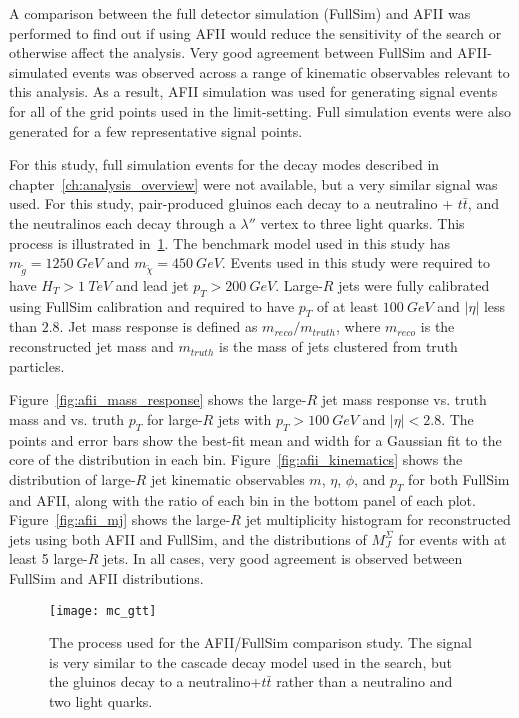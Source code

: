 A comparison between the full detector simulation (FullSim) and AFII was performed to find out if using AFII would reduce the sensitivity of the search or otherwise affect the analysis.
Very good agreement between FullSim and AFII-simulated events was observed across a range of kinematic observables relevant to this analysis.
As a result, AFII simulation was used for generating signal events for all of the grid points used in the limit-setting.
Full simulation events were also generated for a few representative signal points.

For this study, full simulation events for the decay modes described in chapter~\ref{ch:analysis_overview} were not available, but a very similar signal was used.
For this study, pair-produced gluinos each decay to a neutralino + $t\bar{t}$, and the neutralinos each decay through a $\lambda''$ vertex to three light quarks.
This process is illustrated in~\ref{fig:mc_gtt}.
The benchmark model used in this study has $m_{\tilde{g}}=1250~GeV$ and $m_{\tilde{\chi}}=450~GeV$.
Events used in this study were required to have $H_{T}>1~TeV$ and lead jet $p_{T}>200~GeV$.
Large-$R$ jets were fully calibrated using FullSim calibration and required to have $p_{T}$ of at least $100~GeV$ and $|\eta|$ less than $2.8$.
Jet mass response is defined as $m_{reco}/m_{truth}$, where $m_{reco}$ is the reconstructed jet mass and $m_{truth}$ is the mass of jets clustered from truth particles.

Figure~\ref{fig:afii_mass_response} shows the large-$R$ jet mass response vs. truth mass and vs. truth $p_{T}$ for large-$R$ jets with $p_{T}>100~GeV$ and $|\eta|<2.8$.
The points and error bars show the best-fit mean and width for a Gaussian fit to the core of the distribution in each bin.
Figure~\ref{fig:afii_kinematics} shows the distribution of large-$R$ jet kinematic observables $m$, $\eta$, $\phi$, and $p_{T}$ for both FullSim and AFII, along with the ratio of each bin in the bottom panel of each plot.
Figure~\ref{fig:afii_mj} shows the large-$R$ jet multiplicity histogram for reconstructed jets using both AFII and FullSim, and the distributions of $M_{J}^{\Sigma}$ for events with at least 5 large-$R$ jets.
In all cases, very good agreement is observed between FullSim and AFII distributions.

\begin{figure}[!ht]\centering
    \texttt{[image: mc\_gtt]}
    \caption{The process used for the AFII/FullSim comparison study.
    The signal is very similar to the cascade decay model used in the search, but the gluinos decay to a neutralino+$t\bar{t}$ rather than a neutralino and two light quarks.}
    \label{fig:mc_gtt}
\end{figure}


